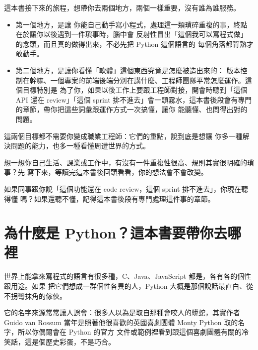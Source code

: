 
這本書接下來的旅程，想帶你去兩個地方，兩個一樣重要，沒有誰為誰服務。

\begin{itemize}
\item 第一個地方，是讓
你能自己動手寫小程式，處理這一類瑣碎重複的事，終點在於讓你以後遇到一件瑣事時，腦中會
反射性冒出「這個我可以寫程式做」的念頭，而且真的做得出來，不必先把 Python 這個語言的
每個角落都背熟才敢動手。
\item 第二個地方，是讓你看懂「軟體」這個東西究竟是怎麼被造出來的：
版本控制在幹嘛、一個專案的前端後端分別在講什麼、工程師團隊平常怎麼運作。這個目標特別是
為了你，如果以後工作上要跟工程師對接，開會時聽到「這個 API 還在 review」「這個 sprint
排不進去」會一頭霧水，這本書後段會有專門的章節，帶你把這些詞彙跟運作方式一次搞懂，讓你
能聽懂、也問得出對的問題。
\end{itemize}

這兩個目標都不需要你變成職業工程師：它們的重點，說到底是想讓
你多一種解決問題的能力，也多一種看懂周遭世界的方式。

\begin{drills}[label=drills:why-program]
\item 想一想你自己生活、課業或工作中，有沒有一件重複性很高、規則其實很明確的瑣事？先
寫下來，等讀完這本書後回頭看看，你的想法會不會改變。
\item 如果同事跟你說「這個功能還在 code review，這個 sprint 排不進去」，你現在聽得懂
嗎？如果還聽不懂，記得這本書後段有專門處理這件事的章節。
\end{drills}

\section{為什麼是 Python？這本書要帶你去哪裡}
\label{sec:why-python}

世界上能拿來寫程式的語言有很多種，C、Java、JavaScript 都是，各有各的個性跟用途。如果
把它們想成一群個性各異的人，Python 大概是那個說話最直白、從不拐彎抹角的傢伙。

它的名字來源常常讓人誤會：很多人以為是取自那種會咬人的蟒蛇，其實作者 Guido van Rossum
當年是照著他很喜歡的英國喜劇團體 Monty Python 取的名字，所以你偶爾會在 Python 的官方
文件或範例裡看到跟這個喜劇團體有關的冷笑話，這是個歷史彩蛋，不是巧合。


